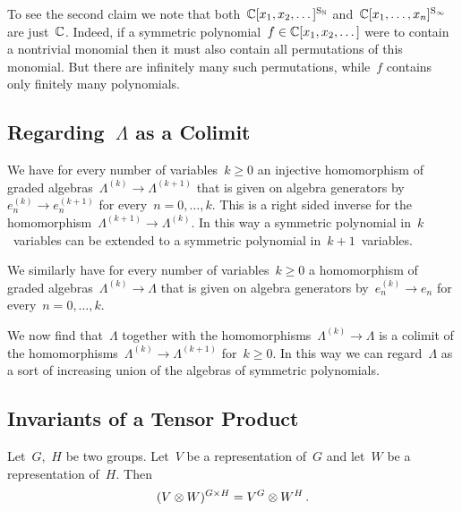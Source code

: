 \documentclass[a4paper,11pt]{scrartcl}
\begin{document}
To see the second claim we note that both~$\mathbb{C}[x_1, x_2, \dotsc]^{\mathrm{S}_{\mathbb{N}}}$ and~$\mathbb{C}[x_1, \dotsc, x_n]^{\mathrm{S}_\infty}$ are just~$\mathbb{C}$.
Indeed, if a symmetric polynomial~$f \in \mathbb{C}[x_1, x_2, \dotsc]$ were to contain a nontrivial monomial then it must also contain all permutations of this monomial.
But there are infinitely many such permutations, while~$f$ contains only finitely many polynomials.


\subsection{Regarding~$\Lambda$ as a Colimit}
\label{symmetric functions as colimit}

We have for every number of variables~$k \geq 0$ an injective homomorphism of graded algebras~$\Lambda^{(k)} \to \Lambda^{(k+1)}$ that is given on algebra generators by~$e^{(k)}_n \to e^{(k+1)}_n$ for every~$n = 0, \dotsc, k$.
This is a right sided inverse for the homomorphism~$\Lambda^{(k+1)} \to \Lambda^{(k)}$.
In this way a symmetric polynomial in~$k$~variables can be extended to a symmetric polynomial in~$k+1$~variables.

We similarly have for every number of variables~$k \geq 0$ a homomorphism of graded algebras~$\Lambda^{(k)} \to \Lambda$ that is given on algebra generators by~$e^{(k)}_n \to e_n$ for every~$n = 0, \dotsc, k$.

We now find that~$\Lambda$ together with the homomorphisms~$\Lambda^{(k)} \to \Lambda$ is a colimit of the homomorphisms~$\Lambda^{(k)} \to \Lambda^{(k+1)}$ for~$k \geq 0$.
In this way we can regard~$\Lambda$ as a sort of increasing union of the algebras of symmetric polynomials.



\subsection{Invariants of a Tensor Product}
\label{invariants of tensor product}

\begin{lemma}
  Let~$G$,~$H$ be two groups.
  Let~$V$ be a representation of~$G$ and let~$W$ be a representation of~$H$.
  Then
  \[
    (V \otimes W)^{G \times H}
    =
    V^G \otimes W^H \,.
  \]
\end{lemma}
\end{document}
